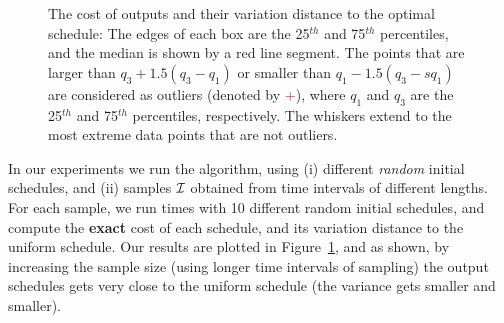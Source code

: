 \begin{figure}[htbp]
	\caption{\scriptsize The cost of \algonameapx outputs and their variation distance to the optimal schedule: 
	The edges of each box are the 25$^{th}$ and 75$^{th}$ percentiles, and the median is shown by a red line segment.  The points that are larger than $q_3 + 1.5(q_3 - q_1)$ or smaller than $q_1 - 1.5(q_3 -s q_1)$ are considered as outliers (denoted by \textcolor{red}{$+$}), where $q_1$ and $q_3$ are the  25$^{th}$ and 75$^{th}$ percentiles, respectively. The whiskers extend to the most extreme data points that are not outliers.
	} \label{fig:unique}
\end{figure}
In our experiments we run the \algonameapx algorithm, using (i) different \emph{random} initial schedules, and (ii) samples $\mathcal{I}$ obtained from time intervals of different lengths. For each sample, we run  times with 10 different random initial schedules, and compute the \textbf{exact} cost of each schedule, and its variation distance to the uniform schedule. Our results are plotted in Figure~\ref{fig:unique}, and as shown, by increasing the sample size (using longer time intervals of sampling) the output schedules gets very close to the uniform schedule (the variance gets smaller and smaller).

